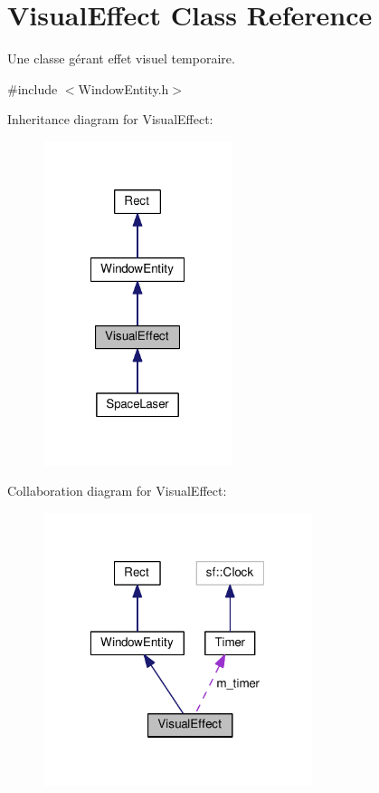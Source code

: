 \hypertarget{class_visual_effect}{\section{Visual\-Effect Class Reference}
\label{class_visual_effect}
}


Une classe gérant effet visuel temporaire.  




{\ttfamily \#include $<$Window\-Entity.\-h$>$}



Inheritance diagram for Visual\-Effect\-:\nopagebreak
\begin{figure}[H]
\begin{center}
\leavevmode
\includegraphics[width=156pt]{class_visual_effect__inherit__graph}
\end{center}
\end{figure}


Collaboration diagram for Visual\-Effect\-:\nopagebreak
\begin{figure}[H]
\begin{center}
\leavevmode
\includegraphics[width=223pt]{class_visual_effect__coll__graph}
\end{center}
\end{figure}
